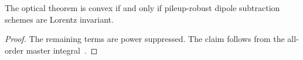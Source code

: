 \begin{lemma}\label{thm:4}
The optical theorem is convex if and only if pileup-robust dipole
subtraction schemes are Lorentz invariant.
\end{lemma}

\begin{proof}
The remaining terms are power suppressed. The claim follows from the
all-order master
integral~\cite{TPC:1008-Kolmogorov-Arnold-Networks-Are-All-You-Need-for-Optimal-Transport-Plans-September-21-2026}.
\end{proof}

